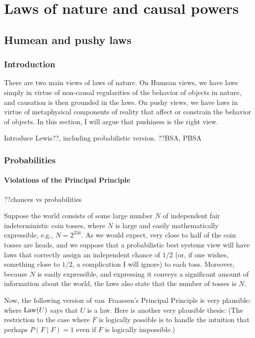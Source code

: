 \chaptertail 

\def\mychapter{IX}

\chapter{Laws of nature and causal powers}\label{ch:laws}
\section{Humean and pushy laws}
\subsection{Introduction}
There are two main views of laws of nature. On Humean views, we have laws simply in virtue of non-causal 
regularities of the behavior of objects in nature, and causation is then grounded in the laws. On pushy views, 
we have laws in virtue of metaphysical components of reality that affect or constrain the behavior of objects. 
In this section, I will argue that pushiness is the right view. 

Introduce Lewis??, including probabilistic version. ??BSA, PBSA

\subsection{Probabilities}
\subsubsection{Violations of the Principal Principle}
??chances vs probabilities

Suppose the world consists of some large number $N$ of independent fair indeterministic coin tosses, where $N$ is large
and easily mathematically expressible, e.g., $N=2^{256}$. As we would expect, very close to half of the coin tosses are heads, and 
we suppose that a probabilistic best systems view will have laws that correctly assign an independent chance of $1/2$ (or, if 
one wishes,  something close to $1/2$, a complication I will ignore) to each toss. Moreover, because $N$ is easily expressible,
and expressing it conveys a significant amount of information about the world, the laws also state that the number of tosses is
$N$. 

Now, the following version of van~Fraassen's Principal Principle is very plausible:
where $\operatorname{Law}(U)$ says that $U$ is a law.
Here is another very plausible thesis:
(The restriction to the case where $F$ is logically possible is to handle the intuition that perhaps $P(F \mid F)=1$
even if $F$ is logically impossible.)

